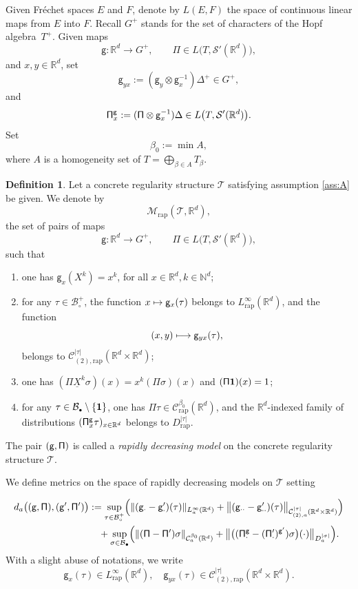 \documentclass[11pt]{article}
\numberwithin{equation}{section}
\newenvironment{enumeratea}
{\bgroup\def\theenumi{\alph{enumi}}\begin{enumerate}}
{\end{enumerate}\egroup}
\newcommand\mto{\mathchoice{\longmapsto}{\mapsto}{\mapsto}{\mapsto}}
\newcommand{\sbullet}{{\scriptscriptstyle\bullet}}
\theoremstyle{plain}
\theoremstyle{definition}
\newtheorem{defn}[thm]{Definition}
\newcommand{\rap}{\mathrm{rap}}
\newcommand{\sfg}{\mathsf{g}}
\newcommand{\sfPi}{\mathsf{\Pi}}
\newcommand{\scrM}{\mathscr{M}}
\newcommand{\scrT}{\mathscr{T}}
\newcommand{\bbN}{\mathbb{N}}
\newcommand{\bbR}{\mathbb{R}}
\newcommand{\mcB}{\mathcal{B}}
\newcommand{\mcC}{\mathcal{C}}
\newcommand\mcS{\mathcal{S}}
\begin{document}
Given Fréchet spaces $E$ and $F$, denote by $L(E,F)$ the space of continuous linear maps from $E$ into $F$. Recall $G^+$ stands for the set of characters of the Hopf algebra~$T^+$. Given maps
\[
\sfg:\bbR^d\to G^+,\qquad \sfPi\in L\bigl(T,\mcS'(\bbR^d)\bigr),
\]
and $x,y\in\bbR^d$, set
\[
\sfg_{yx} := (\sfg_y\otimes\sfg_x^{-1})\Delta^+\in G^+,
\]
and
\[
{\sf \Pi}^{\sf g}_x:=(\sfPi\otimes\sfg_x^{-1})\Delta\in L\bigl(T,\mcS'(\bbR^d)\bigr).
\]
Set
\[
\beta_0:=\min A,
\]
where $A$ is a homogeneity set of $T=\bigoplus_{\beta\in A}T_\beta$.

\begin{defn} \label{defi:weighted model}
Let a concrete regularity structure $\scrT$ satisfying assumption \eqref{ass:A} be given. We denote by
\[
\scrM_\rap(\scrT,\bbR^d),
\]
the set of pairs of maps
\[
\sfg : \bbR^d\to G^+,\qquad \sfPi\in L\bigl(T,\mcS'(\bbR^d)\bigr),
\]
such that
\begin{enumeratea}
	\item\label{defi:weighted modela} one has $\sfg_x(X^k)=x^k$, for all $x\in\bbR^d, k\in\bbN^d$;

	\item\label{defi:weighted modelb} for any $\tau\in\mcB_\circ^+$, the function $x\mto\sfg_x(\tau)$ belongs to $L_\rap^\infty(\bbR^d)$, and the function
\[
(x,y)\mto\sfg_{yx}(\tau),
\]
belongs to $\mcC_{(2),\rap}^{|\tau|}(\bbR^d\times\bbR^d)$;

	\item\label{defi:weighted modelc} one has $(\sfPi \underline{X}^k\sigma)(x)=x^k(\sfPi\sigma)(x)$ and $(\sfPi{\bf1})(x) = 1$;

	\item\label{defi:weighted modeld} for any $\tau\in\mcB_\sbullet\setminus\{{\bf1}\}$, one has $\sfPi\tau\in \mcC^{\beta_0}_\rap(\bbR^d)$, and the $\bbR^d$-indexed family of distributions $({\sf \Pi}^{\sf g}_x\tau)_{x\in\bbR^d}$ belongs to $D_\rap^{|\tau|}$.
\end{enumeratea}
The pair $\sf (g,\Pi)$ is called a \emph{rapidly decreasing model} on the concrete regularity structure $\scrT$.
\end{defn}

We define metrics on the space of rapidly decreasing models on $\scrT$ setting

\begin{align*}
d_a\bigl(({\sf g},{\sf\Pi}),({\sf g}',{\sf\Pi}')\bigr)
&:= \sup_{\tau\in\mcB_\circ^+}
\Bigl(\|({\sf g}_\cdot-{\sf g}_\cdot')(\tau)\|_{L_a^\infty(\bbR^d)}
+ \big\|({\sf g}_{\cdot\cdot}-{\sf g}_{\cdot\cdot}')(\tau)\big\|_{\mcC^{\vert\tau\vert}_{(2),a}(\bbR^d\times\bbR^d)}\Bigr)\\
&\quad+\sup_{\sigma\in\mcB_\sbullet}
\Bigl(\|({\sf\Pi}-{\sf\Pi}')\sigma\|_{\mcC^{\beta_0}_a(\bbR^d)}
+ \big\|\bigl(({\sf\Pi}_\cdot^{\sf g}-({\sf\Pi}_\cdot')^{{\sf g}'})\sigma\bigr)(\cdot) \big\|_{D^{\vert\sigma\vert}_{a}}\Bigr).
\end{align*}
With a slight abuse of notations, we write
\[
\sfg_x(\tau)\in L_\rap^\infty(\bbR^d),\quad \sfg_{yx}(\tau)\in \mcC_{(2),\rap}^{|\tau|}(\bbR^d\times\bbR^d).
\]
\end{document}
